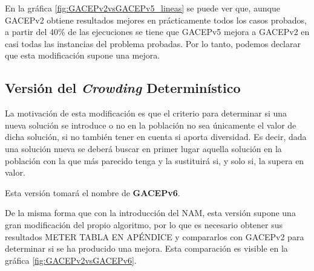 En la gráfica \ref{fig:GACEPv2vsGACEPv5_lineas} se puede ver que, aunque GACEPv2 obtiene resultados mejores en prácticamente todos los casos probados, a partir del 40\% de las ejecuciones se tiene que GACEPv5 mejora a GACEPv2 en casi todas las instancias del problema probadas. 
Por lo tanto, podemos declarar que esta modificación supone una mejora. 

\subsection{Versión del \textit{Crowding} Determinístico}

La motivación de esta modificación es que el criterio para determinar si una nueva solución se introduce o no en la población no sea únicamente el valor de dicha solución, si no también tener en cuenta si aporta diversidad. 
Es decir, dada una solución nueva se deberá buscar en primer lugar aquella solución en la población con la que más parecido tenga y la sustituirá si, y solo si, la supera en valor. 

Esta versión tomará el nombre de \textbf{GACEPv6}. 

De la misma forma que con la introducción del NAM, esta versión supone una gran modificación del propio algoritmo, por lo que es necesario obtener sus resultados \color{red} METER TABLA EN APÉNDICE \color{black} y compararlos con GACEPv2 para determinar si se ha producido una mejora. 
Esta comparación es visible en la gráfica \ref{fig:GACEPv2vsGACEPv6}.

